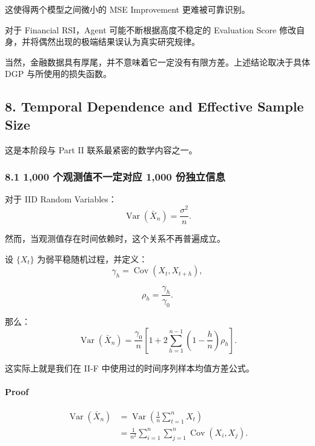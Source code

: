 这使得两个模型之间微小的 MSE Improvement 更难被可靠识别。

对于 Financial RSI，Agent 可能不断根据高度不稳定的 Evaluation Score 修改自身，并将偶然出现的极端结果误认为真实研究规律。

当然，金融数据具有厚尾，并不意味着它一定没有有限方差。上述结论取决于具体 DGP 与所使用的损失函数。

\hypertarget{part-4-58-0007-temporal-dependence-and-effective-sample-size}{%
\subsection{8. Temporal Dependence and Effective Sample Size}\label{part-4-58-0007-temporal-dependence-and-effective-sample-size}}

这是本阶段与 Part II 联系最紧密的数学内容之一。

\hypertarget{part-4-58-0007-ux4e2aux89c2ux6d4bux503cux4e0dux4e00ux5b9aux5bf9ux5e94-1000-ux4efdux72ecux7acbux4fe1ux606f}{%
\subsubsection{8.1 1,000 个观测值不一定对应 1,000 份独立信息}\label{part-4-58-0007-ux4e2aux89c2ux6d4bux503cux4e0dux4e00ux5b9aux5bf9ux5e94-1000-ux4efdux72ecux7acbux4fe1ux606f}}

对于 IID Random Variables：
\[\operatorname{Var}(\bar X_n)
=
\frac{\sigma^2}{n}.\]

然而，当观测值存在时间依赖时，这个关系不再普遍成立。

设 \(\{X_t\}\) 为弱平稳随机过程，并定义：
\[\gamma_h
=
\operatorname{Cov}(X_t,X_{t+h}),\]

\[\rho_h=\frac{\gamma_h}{\gamma_0}.\]

那么：
\[\boxed{
\operatorname{Var}(\bar X_n)
=
\frac{\gamma_0}{n}
\left[
1+
2\sum_{h=1}^{n-1}
\left(1-\frac hn\right)\rho_h
\right].
}\]

这实际上就是我们在 II-F 中使用过的时间序列样本均值方差公式。

\hypertarget{part-4-58-0007-proof}{%
\paragraph{Proof}\label{part-4-58-0007-proof}}

\[\begin{aligned}
\operatorname{Var}(\bar X_n)
&=
\operatorname{Var}
\left(
\frac1n\sum_{t=1}^nX_t
\right)\\
&=\frac1{n^2}
\sum_{i=1}^n
\sum_{j=1}^n
\operatorname{Cov}(X_i,X_j).
\end{aligned}\]

